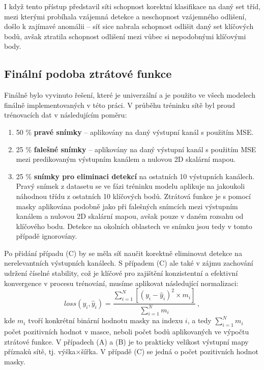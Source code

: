 I když tento přístup představil síti schopnost korektní klasifikace na daný set tříd, mezi kterými probíhala vzájemná detekce a neschopnost vzájemného odlišení, došlo k zajímavé anomálii -- síť sice nabrala schopnost odlišit daný set klíčových bodů, avšak ztratila schopnost odlišení mezi vůbec si nepodobnými klíčovými body.

\subsection{Finální podoba ztrátové funkce}
\label{subsec:Chapter473_final_loss}

Finálně bylo vyvinuto řešení, které je univerzální a je použito ve všech modelech finálně implementovaných v této práci. V průběhu tréninku sítě byl proud trénovacích dat v následujícím poměru:
\begin{enumerate}[label=(\Alph*)]
    \item 50 \% \textbf{pravé snímky} -- aplikovány na daný výstupní kanál s použitím MSE.
    \item 25 \% \textbf{falešné snímky} -- aplikovány na daný výstupní kanál s použitím MSE mezi predikovaným výstupním kanálem a nulovou 2D skalární mapou.
    \item 25 \% \textbf{snímky pro eliminaci detekcí} na ostatních 10 výstupních kanálech. Pravý snímek z datasetu se ve fázi tréninku modelu aplikuje na jakoukoli náhodnou třídu z ostatních 10 klíčových bodů. Ztrátová funkce je s pomocí masky aplikována podobně jako při falešných snímcích mezi výstupním kanálem a nulovou 2D skalární mapou, avšak pouze v daném rozsahu od klíčového bodu. Detekce na okolních oblastech ve snímku jsou tedy v tomto případě ignorovány.
\end{enumerate}
Po přidání případu (C) by se měla síť naučit korektně eliminovat detekce na nerelevantních výstupních kanálech. S případem (C) ale také v zájmu zachování udržení číselné stability, což je klíčové pro zajištění konzistentní a efektivní konvergence v procesu trénování, musíme aplikovat následující normalizaci:
\begin{equation}
loss(y_i, \hat{y}_i) = \frac{\sum_{i=1}^{N} [(y_i - \hat{y}_i)^2\times m_i]}{\sum_{i=1}^{N} m_i}\,,
\end{equation}
kde $m_i$ tvoří konkrétní binární hodnotu masky na indexu $i$, a tedy $\sum_{i=1}^{N} m_i$ počet pozitivních hodnot v masce, neboli počet bodů aplikovaných ve výpočtu ztrátové funkce. V případech (A) a (B) je to prakticky velikost výstupní mapy příznaků sítě, tj. výška$\times$šířka. V případě (C) se jedná o počet pozitivních hodnot masky.

